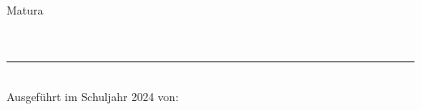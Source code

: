 	\begin{center}
	\vspace*{1cm}
	{\huge Matura}\\
	\bigskip
	{\LARGE \mytitle} \\
	\smallskip
	{\large \myschool} \\
	\bigskip
	\hrule
	\bigskip
	{\large \myinstitute} \\
	
	\bigskip
	Ausgeführt im Schuljahr 2024 von: \\
	\myauthor \\
	\bigskip


\end{center}